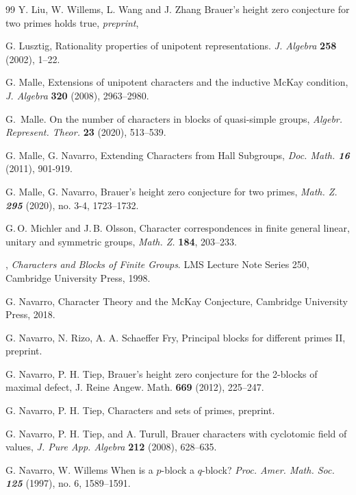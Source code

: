 \documentclass[12pt,leqno,a4paper]{amsart}
\theoremstyle{remark}
\begin{document}
\begin{thebibliography}{99}
{\sc Y. Liu, W. Willems, L. Wang and J. Zhang} 
Brauer's height zero conjecture for two primes holds true,
\emph{preprint}, 


{\sc G. Lusztig}, Rationality properties of unipotent representations. \emph{J. Algebra} \textbf{258} (2002), 1--22.

{\sc G. Malle}, Extensions of unipotent characters and the inductive
McKay condition, \emph{J. Algebra} \textbf{320} (2008), 2963--2980.

{\sc G.~Malle}.
\newblock On the number of characters in blocks of quasi-simple groups, \emph{Algebr. Represent. Theor.} \textbf{23} (2020), 513--539.

{\sc G. Malle, G. Navarro}, Extending Characters from Hall Subgroups,
\emph{Doc. Math. \bf 16} (2011), 901-919. 

{\sc G. Malle, G. Navarro}, Brauer's height zero conjecture
for two primes, 
\emph{Math. Z. \bf 295} (2020), no. 3-4, 1723--1732. 

{\sc G.\,O. Michler and J.\,B. Olsson}, Character correspondences in
finite general linear, unitary and symmetric groups, \emph{Math. Z.}
\textbf{184}, 203--233.

, \emph{Characters   and Blocks   of Finite Groups}. LMS Lecture Note Series 250,  Cambridge University Press, 1998. 
  

{\sc G. Navarro},
Character Theory and the McKay Conjecture,
Cambridge University Press, 2018. 

{\sc G. Navarro, N. Rizo, A. A. Schaeffer Fry},
Principal blocks for different primes II, preprint.

{\sc G. Navarro,  P. H. Tiep,}  Brauer's height zero conjecture for the 2-blocks of maximal defect,
 J. Reine Angew. Math. {\bf 669} (2012), 225--247. 

{\sc G. Navarro, P. H. Tiep},
Characters and sets of primes, preprint.

{\sc G. Navarro, P. H. Tiep, and A. Turull}, Brauer characters with cyclotomic field of values,
\emph{J. Pure App. Algebra} \textbf{212} (2008), 628--635.

{\sc G. Navarro, W. Willems}
 When is a $p$-block a $q$-block? 
 \emph{Proc. Amer. Math. Soc. \bf 125} (1997), no. 6, 1589--1591.
 

\end{thebibliography}
\end{document}
